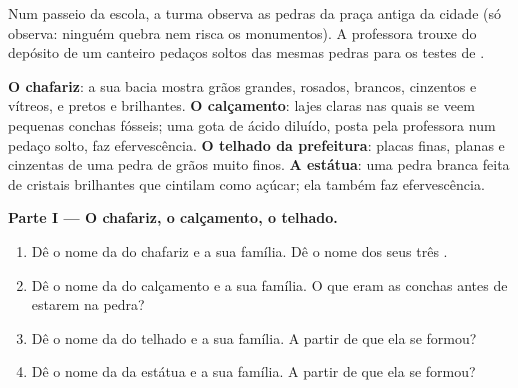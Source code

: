 \begin{problem}
\label{pb:g6:rocks-and-minerals:1}
Num passeio da escola, a turma observa as pedras da praça antiga da cidade
(só observa: ninguém quebra nem risca os monumentos). A professora trouxe
do depósito de um canteiro pedaços soltos das mesmas pedras para os testes
de .

\smallskip
\noindent\textbf{O chafariz}: a sua bacia mostra grãos grandes, rosados,
        brancos, cinzentos e vítreos, e pretos e brilhantes.
\textbf{O calçamento}: lajes claras nas quais se veem pequenas conchas
        fósseis; uma gota de ácido diluído, posta pela professora num
        pedaço solto, faz efervescência.
\textbf{O telhado da prefeitura}: placas finas, planas e cinzentas de uma
        pedra de grãos muito finos.
\textbf{A estátua}: uma pedra branca feita de cristais brilhantes que
        cintilam como açúcar; ela também faz efervescência.

\medskip
\noindent\textbf{Parte I --- O chafariz, o calçamento, o telhado.}
\begin{enumerate}
  \item Dê o nome da  do chafariz e a sua família. Dê o nome dos seus
        três .
  \item Dê o nome da  do calçamento e a sua família. O que eram as
        conchas antes de estarem na pedra?
  \item Dê o nome da  do telhado e a sua família. A partir de que
         ela se formou?
  \item Dê o nome da  da estátua e a sua família. A partir de que
         ela se formou?
\end{enumerate}


\end{problem}

